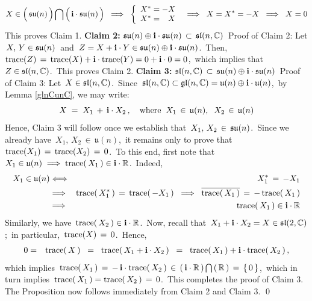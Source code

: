 \begin{equation*}
X \in
    \left(\,\overset{{\color{white}.}}{\su(n)}\,\right)
    \bigcap
    \left(\,\overset{{\color{white}.}}{\i\cdot\su(n)}\,\right)
\;\;\Longrightarrow\;\;
    \left\{\begin{array}{c}
        X^{*} = -X
        \\
        X^{*} = {\color{white}-}X
        \end{array}\right.
\;\;\Longrightarrow\;\;
    X = X^{*} = -X
\;\;\Longrightarrow\;\;
    X = 0
\end{equation*}
This proves Claim 1.
\vskip 0.5cm
\noindent
\textbf{Claim 2:}\; $\mathfrak{su}(n) \oplus \mathbf{i}\cdot\mathfrak{su}(n) \,\subset\, \mathfrak{sl}(n,\mathbb{C})$\,
\vskip 0.1cm
\noindent
Proof of Claim 2:\;
Let \,$X,\, Y \in \mathfrak{su}(n)$\, and \,$Z = X + \mathbf{i}\cdot Y \in \mathfrak{su}(n) \oplus \mathbf{i}\cdot\mathfrak{su}(n)$.\,
Then, \,$\textnormal{trace}(Z) \,=\, \textnormal{trace}(X) + \mathbf{i}\cdot\textnormal{trace}(Y) = 0 + \mathbf{i}\cdot 0 = 0$,\,
which implies that \,$Z \in \mathfrak{sl}(n,\mathbb{C})$.\,
This proves Claim 2.
\vskip 0.5cm
\noindent
\textbf{Claim 3:}\; $\mathfrak{sl}(n,\mathbb{C}) \,\subset\, \mathfrak{su}(n) \oplus \mathbf{i}\cdot\mathfrak{su}(n)$\,
\vskip 0.1cm
\noindent
Proof of Claim 3:\;
Let \,$X \in \mathfrak{sl}(n,\mathbb{C})$.\,
Since \,$\mathfrak{sl}(n,\mathbb{C}) \subset \mathfrak{gl}(n,\mathbb{C}) = \mathfrak{u}(n) \oplus \mathbf{i}\cdot\mathfrak{u}(n)$,\,
by Lemma \ref{glnCunC}, we may write:
\begin{equation*}
X
\; = \;
    X_{1} \,+\, \mathbf{i} \cdot X_{2}\,,
\quad
\textnormal{where}\;\;
X_{1}
\, \in \,
    \mathfrak{u}(n),
\;\;
X_{2}
\, \in \,
    \mathfrak{u}(n)
\end{equation*}
Hence, Claim 3 will follow once we establish that
\,$X_{1},\, X_{2} \,\in\, \mathfrak{su}(n)$.\,
Since we already have
\,$X_{1},\, X_{2} \,\in\, \mathfrak{u}(n)$,\,
it remains only to prove that
\,$\textnormal{trace}(X_{1}) \,=\, \textnormal{trace}(X_{2}) \,=\, 0$.\,
To this end, first note that
\,$X_{1} \in \mathfrak{u}(n) \;\Longrightarrow\; \textnormal{trace}(\,X_{1}\,) \in \mathbf{i}\cdot\mathbb{R}$.\,
Indeed,
\begin{eqnarray*}
X_{1} \in \mathfrak{u}(n)
& \Longleftrightarrow &
    X_{1}^{*} \,=\, -X_{1}
\\
& \Longrightarrow &
    \textnormal{trace}(\,X_{1}^{*}\,) \,=\, \textnormal{trace}(\,-X_{1}\,)
\;\;\Longrightarrow\;\;
    \overline{\textnormal{trace}(\,X_{1}\,)} \,=\, -\,\textnormal{trace}(\,X_{1}\,)
\\
& \Longrightarrow &
    \textnormal{trace}(\,X_{1}\,) \in \mathbf{i}\cdot\mathbb{R}
\end{eqnarray*}
Similarly, we have \,$\textnormal{trace}(\,X_{2}\,) \in \mathbf{i}\cdot\mathbb{R}$.\,
Now, recall that \,$X_{1} + \mathbf{i} \cdot X_{2} = X \in \mathfrak{sl}(2,\mathbb{C})$;\,
in particular, \,$\textnormal{trace}(X) \,=\, 0$.\,
Hence,
\begin{eqnarray*}
0
& = &
    \textnormal{trace}(\,X\,)
\;\; = \;\;
    \textnormal{trace}(\,X_{1} + \mathbf{i} \cdot X_{2}\,)
\;\; = \;\;
    \textnormal{trace}(\,X_{1}\,) + \mathbf{i}\cdot\textnormal{trace}(\,X_{2}\,)\,,
\end{eqnarray*}
which implies
\,$
\textnormal{trace}(\,X_{1}\,)
\, = \,
    -\,\mathbf{i}\cdot\textnormal{trace}(\,X_{2}\,)
\, \in \,
    \left(\,\mathbf{i}\cdot\mathbb{R}\,\right)
    \bigcap
    \left(\,\mathbb{R}\,\right)
\, = \,
    \{\,0\,\}
$,\,
which in turn implies
\,$\textnormal{trace}(\,X_{1}\,) = \textnormal{trace}(\,X_{2}\,) \,=\, 0$.\,
This completes the proof of Claim 3.
\vskip 0.5cm
\noindent
The Proposition now follows immediately from Claim 2 and Claim 3.
\qed

